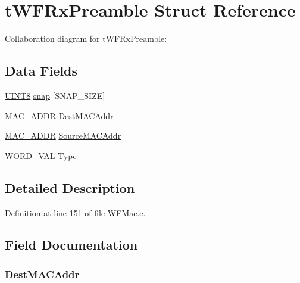 \hypertarget{structt_w_f_rx_preamble}{}\section{t\+W\+F\+Rx\+Preamble Struct Reference}
\label{structt_w_f_rx_preamble}


Collaboration diagram for t\+W\+F\+Rx\+Preamble\+:
\subsection*{Data Fields}
\begin{DoxyCompactItemize}
\item 
\hyperlink{_generic_type_defs_8h_ab27e9918b538ce9d8ca692479b375b6a}{U\+I\+N\+T8} \hyperlink{structt_w_f_rx_preamble_a54aafe39438681861f7bce54ffceb534}{snap} \mbox{[}S\+N\+A\+P\+\_\+\+S\+I\+Z\+E\mbox{]}
\item 
\hyperlink{_stack_tsk_8h_ad13a037a42c866ac11db19330b840589}{M\+A\+C\+\_\+\+A\+D\+D\+R} \hyperlink{structt_w_f_rx_preamble_ab3be7c1d120c815f1acf7959050eea24}{Dest\+M\+A\+C\+Addr}
\item 
\hyperlink{_stack_tsk_8h_ad13a037a42c866ac11db19330b840589}{M\+A\+C\+\_\+\+A\+D\+D\+R} \hyperlink{structt_w_f_rx_preamble_a4cce91226011afc994b97a630ac3fbf6}{Source\+M\+A\+C\+Addr}
\item 
\hyperlink{union_w_o_r_d___v_a_l}{W\+O\+R\+D\+\_\+\+V\+A\+L} \hyperlink{structt_w_f_rx_preamble_ab2bf26921a49be66edb22ec5294bdfc9}{Type}
\end{DoxyCompactItemize}


\subsection{Detailed Description}


Definition at line 151 of file W\+F\+Mac.\+c.



\subsection{Field Documentation}
\hypertarget{structt_w_f_rx_preamble_ab3be7c1d120c815f1acf7959050eea24}{}
\subsubsection[{Dest\+M\+A\+C\+Addr}]{ Dest\+M\+A\+C\+Addr}\label{structt_w_f_rx_preamble_ab3be7c1d120c815f1acf7959050eea24}


